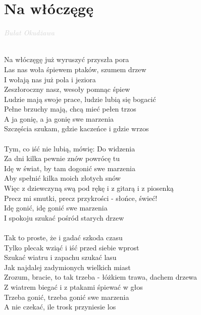 \documentclass[a5paper, 10pt]{book}
\begin{document}
\section{Na włóczęgę}\textcolor{lightgray}{\textit{Bułat Okudżawa}}\\~\\
\begin{minipage}[t]{0.82\textwidth}
  Na włóczęgę już wyruszyć przyszła pora\\
  Las nas woła śpiewem ptaków, szumem drzew\\
  I wołają nas już pola i jeziora\\
  Zeszłoroczny nasz, wesoły pomnąc śpiew\\
  \hspace*{5mm}Ludzie mają swoje prace, ludzie lubią się bogacić\\
  \hspace*{5mm}Pełne brzuchy mają, chcą mieć pełen trzos\\
  A ja gonię, a ja gonię swe marzenia\\
  Szczęścia szukam, gdzie kaczeńce i gdzie wrzos\\
  \\
  Tym, co iść nie lubią, mówię: Do widzenia\\
  Za dni kilka pewnie znów powrócę tu\\
  Idę w świat, by tam dogonić swe marzenia\\
  Aby spełnić kilka moich złotych snów\\
  \hspace*{5mm}Więc z dziewczyną swą pod rękę i z gitarą i z piosenką\\
  \hspace*{5mm}Precz mi smutki, precz przykrości - słońce, świeć!\\
  Idę gonić, idę gonić swe marzenia\\
  I spokoju szukać pośród starych drzew\\
  \\
  Tak to proste, że i gadać szkoda czasu\\
  Tylko plecak wziąć i iść przed siebie wprost\\
  Szukać wiatru i zapachu szukać lasu\\
  Jak najdalej zadymionych wielkich miast\\
  \hspace*{5mm}Zrozum, bracie, to tak trzeba - łóżkiem trawa, dachem drzewa\\
  \hspace*{5mm}Z wiatrem biegać i z ptakami śpiewać w głos\\
  Trzeba gonić, trzeba gonić swe marzenia\\
  A nie czekać, ile trosk przyniesie los\\
  \\

\end{minipage}
\end{document}
